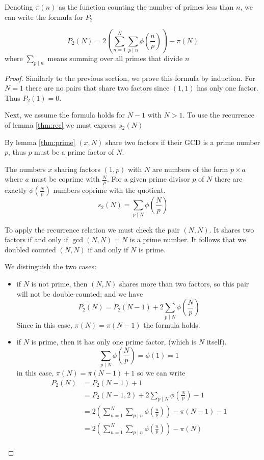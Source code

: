 \documentclass[a4paper, 10pt]{article}
\numberwithin{equation}{section} %
\begin{document}
Denoting $\pi(n)$ as the function counting the number of primes less than $n$,
we can write the formula for $P_2$
\begin{thm}
\[
    P_2(N) = 2\left(\sum_{n=1}^N \sum_{p \mid n}\phi(\frac{n}{p})\right) - \pi(N)
\]
where $\sum_{p \mid n}$ means summing over all primes that divide $n$
\end{thm}

\begin{proof}
Similarly to the previous section, we prove this formula by induction.
For $N=1$ there are no pairs that share two factors since $(1,1)$ has only one factor.
Thus $P_2(1) = 0$.

Next, we assume the formula holds for $N-1$ with $N > 1$.
To use the recurrence of lemma \ref{thm:rec} we must express $s_2(N)$

By lemma \ref{thm:prime} $(x,N)$ share two factors if their GCD is a prime number
$p$, thus $p$ must be a prime factor of $N$.

The numbers $x$ sharing factors $(1,p)$ with $N$ are numbers of the form $p \times a$ where
$a$ must be coprime with $\frac{N}{p}$.
For a given prime divisor $p$ of $N$ there are exactly $\phi(\frac{N}{p})$ numbers coprime
with the quotient.
\[ s_2(N) = \sum_{p  \mid  N} \phi(\frac{N}{p})  \]

To apply the recurrence relation we must check the pair $(N,N)$.
It shares two factors if and only if $\gcd(N,N) = N$ is a prime
number. It follows that we doubled counted $(N,N)$ if and only if $N$ is prime.

We distinguish the two cases:
\begin{itemize}
    \item if $N$ is not prime, then $(N,N)$ shares more than two factors,
    so this pair will not be double-counted; and we have
    \[
        P_2(N) = P_2(N-1) +  2 \sum_{p  \mid  N} \phi(\frac{N}{p})
    \]
    Since in this case, $\pi(N) = \pi(N-1)$ the formula holds.

    \item if $N$ is prime, then it has only one prime factor, (which is $N$ itself).
    \[ \sum_{p  \mid  N} \phi(\frac{N}{p}) = \phi(1) = 1 \]
    in this case, $\pi(N) = \pi(N-1) + 1$ so we can write
    \begin{align*}
        P_2(N)  &= P_2(N-1) + 1\\
                &= P_2(N-1,2) +  2 \sum_{p  \mid  N} \phi(\frac{N}{p}) - 1 \\
                &=  2\left(\sum_{n=1}^N \sum_{p \mid n}\phi(\frac{n}{p})\right) -\pi(N-1) - 1\\
                &=  2\left(\sum_{n=1}^N \sum_{p \mid n}\phi(\frac{n}{p})\right) -\pi(N)\\
    \end{align*}
\end{itemize}

\end{proof}
\end{document}
